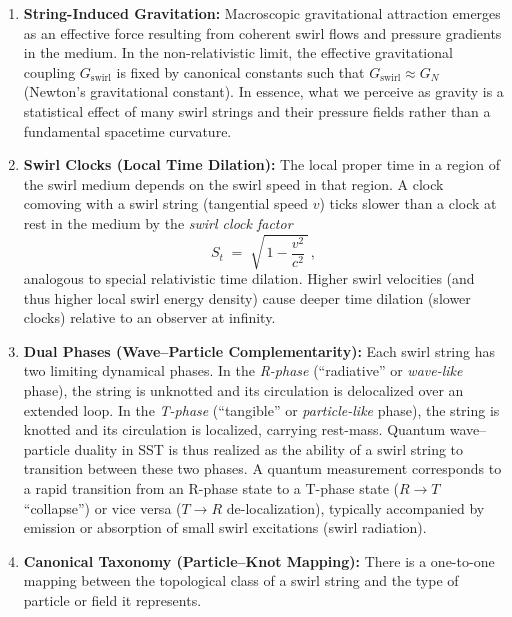 \documentclass[10pt,reprint,aps,onecolumn,nofootinbib]{revtex4-2}
\begin{document}
\begin{enumerate}
	\textit{Rosetta remark.} In the linear mapping to conventional superfluid notation, the circulation quantum
	$\Gamma_0$ matches the Onsager–Feynman value $h/m_{\text{eff}}$ for the relevant excitation, but within SST
	we treat $\Gamma_0$ as primitive and regard $h$ as a derived quantity.
	\item \textbf{String-Induced Gravitation:}\label{axiom:string-gravitation} Macroscopic gravitational attraction emerges as an effective force resulting from coherent swirl flows and pressure gradients in the medium. In the non-relativistic limit, the effective gravitational coupling $G_{\text{swirl}}$ is fixed by canonical constants such that $G_{\text{swirl}} \approx G_N$ (Newton’s gravitational constant). In essence, what we perceive as gravity is a statistical effect of many swirl strings and their pressure fields rather than a fundamental spacetime curvature.
	\item \textbf{Swirl Clocks (Local Time Dilation):}\label{axiom:swirl-clocks} The local proper time in a region of the swirl medium depends on the swirl speed in that region. A clock comoving with a swirl string (tangential speed $v$) ticks slower than a clock at rest in the medium by the \emph{swirl clock factor}
	\[
		S_t \;=\; \sqrt{\,1 - \frac{v^2}{c^2}\,}\,,
	\]
	analogous to special relativistic time dilation. Higher swirl velocities (and thus higher local swirl energy density) cause deeper time dilation (slower clocks) relative to an observer at infinity.
	\item \textbf{Dual Phases (Wave–Particle Complementarity):}\label{axiom:dual-phases} Each swirl string has two limiting dynamical phases. In the \emph{R-phase} (“radiative” or \emph{wave-like} phase), the string is unknotted and its circulation is delocalized over an extended loop. In the \emph{T-phase} (“tangible” or \emph{particle-like} phase), the string is knotted and its circulation is localized, carrying rest-mass. Quantum wave–particle duality in SST is thus realized as the ability of a swirl string to transition between these two phases. A quantum measurement corresponds to a rapid transition from an R-phase state to a T-phase state ($R\to T$ “collapse”) or vice versa ($T\to R$ de-localization), typically accompanied by emission or absorption of small swirl excitations (swirl radiation).
    \item \textbf{Canonical Taxonomy (Particle–Knot Mapping):}\label{axiom:taxonomy}
    There is a one-to-one mapping between the topological class of a swirl string and the type of particle or field it represents.

\end{enumerate}
\end{document}
